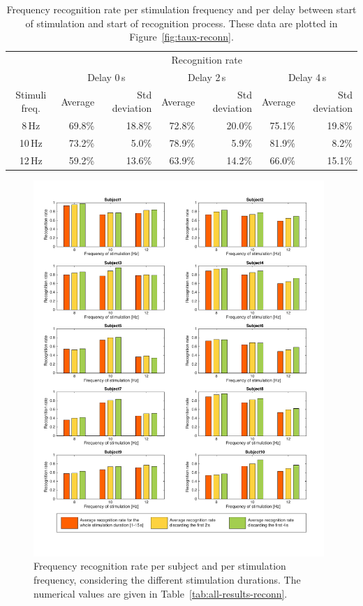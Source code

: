 \documentclass[smallextended]{svjour3}
\begin{document}
\begin{table}\begin{center}
    \begin{tabular}{ c | r | r | r | r | r | r |}
        & \multicolumn{6}{c|}{Recognition rate} \\ 
        & \multicolumn{2}{c|}{Delay 0\,s} & \multicolumn{2}{c|}{Delay 2\,s} & \multicolumn{2}{c|}{Delay 4\,s} \\ 
        Stimuli freq.& Average & Std deviation & Average & Std deviation & Average & Std deviation \\ \hline

         8\,Hz & 69.8\% & 18.8\% & 72.8\% & 20.0\% & 75.1\% & 19.8\% \\
        10\,Hz & 73.2\% &  5.0\% & 78.9\% & 5.9\% & 81.9\% & 8.2\% \\
        12\,Hz & 59.2\% & 13.6\% & 63.9\% & 14.2\% & 66.0\% & 15.1\% \\ \hline
    \end{tabular}
    \caption{Frequency recognition rate per stimulation frequency and per delay between start of stimulation and start of recognition process. These data are plotted in Figure~\ref{fig:taux-reconn}.}
\end{center}\end{table}

\begin{figure}
\center
\includegraphics[width=0.98\textwidth]{figures/all-results-reconn.pdf}
\caption{Frequency recognition rate per subject and per stimulation frequency, considering the different stimulation durations. The numerical values are given in Table~\ref{tab:all-results-reconn}.}
\label{fig:all-results-reconn}
\end{figure}
\end{document}
